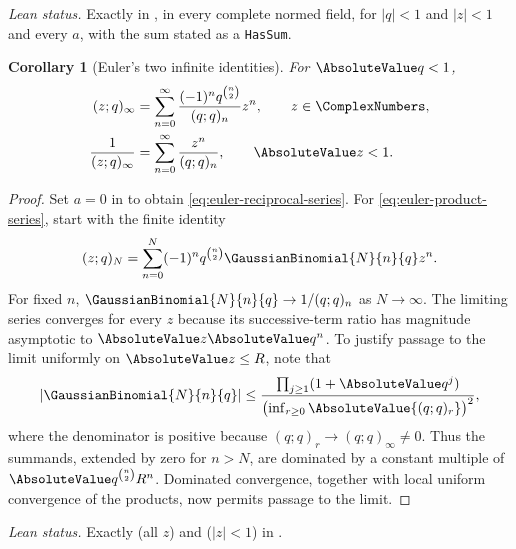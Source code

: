 \documentclass[11pt,a4paper,oneside,openany]{book}
\newtheorem{corollary}[corollary]{Corollary}
\theoremstyle{definition}
\theoremstyle{remark}
\begin{document}
\emph{Lean status.}  Exactly  in
, in every complete normed field, for $|q|<1$ and
$|z|<1$ and every $a$, with the sum stated as a \texttt{HasSum}.


\begin{corollary}[Euler's two infinite identities]\label{cor:euler-infinite}
For $\AbsoluteValue q<1$,
\begin{align}
 (z;q)_\infty
 &=\sum_{n=0}^{\infty}\frac{(-1)^nq^{\binom n2}}{(q;q)_n}z^n,
 \qquad z\in\ComplexNumbers,\label{eq:euler-product-series}\\
 \frac1{(z;q)_\infty}
 &=\sum_{n=0}^{\infty}\frac{z^n}{(q;q)_n},
 \qquad \AbsoluteValue z<1.\label{eq:euler-reciprocal-series}
\end{align}
\end{corollary}

\begin{proof}
Set $a=0$ in  to obtain \eqref{eq:euler-reciprocal-series}.  For \eqref{eq:euler-product-series}, start with the finite identity
\[
 (z;q)_N=\sum_{n=0}^{N}(-1)^nq^{\binom n2}\GaussianBinomial{N}{n}{q} z^n.
\]
For fixed $n$, $\GaussianBinomial{N}{n}{q}\to1/(q;q)_n$ as $N\to\infty$.  The limiting series converges for every $z$ because its successive-term ratio has magnitude asymptotic to $\AbsoluteValue z\AbsoluteValue q^n$.  To justify passage to the limit uniformly on $\AbsoluteValue z\le R$, note that
\[
 \left|\GaussianBinomial{N}{n}{q}\right|
 \le
 \frac{\prod_{j\ge1}(1+\AbsoluteValue q^j)}
      {\bigl(\inf_{r\ge0}\AbsoluteValue{(q;q)_r}\bigr)^{2}},
\]
where the denominator is positive because $(q;q)_r\to(q;q)_\infty\ne0$.  Thus the summands, extended by zero for $n>N$, are dominated by a constant multiple of $\AbsoluteValue q^{\binom n2}R^n$.  Dominated convergence, together with local uniform convergence of the products, now permits passage to the limit.
\end{proof}

\emph{Lean status.}  Exactly  (all $z$) and
 ($|z|<1$) in .
\end{document}
